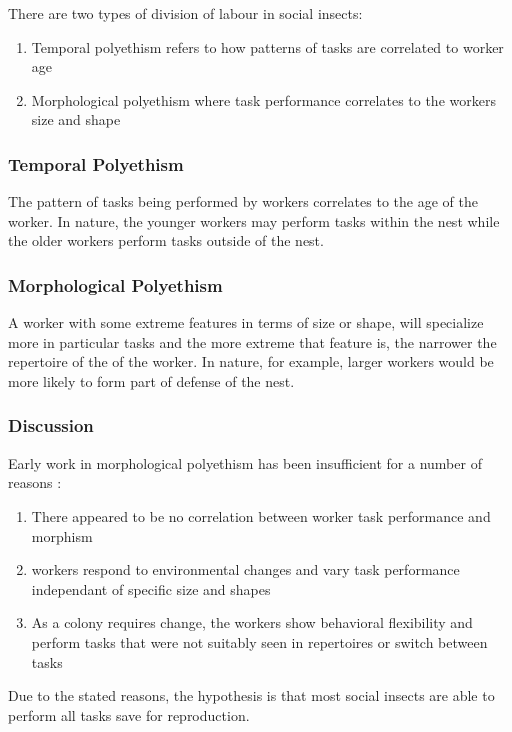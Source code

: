 There are two types of division of labour in social insects: 
\begin{enumerate}
	\item Temporal polyethism refers to how patterns of tasks are correlated to worker age
	\item Morphological polyethism where task performance correlates to the workers size and shape
\end{enumerate}

\subsubsection{Temporal Polyethism}
The pattern of tasks being performed by workers correlates to the age of the worker. In nature, the younger workers may perform tasks within the nest while the older workers perform tasks outside of the nest.
\subsubsection{Morphological Polyethism}
A worker with some extreme features in terms of size or shape, will specialize more in particular tasks and the more extreme that feature is, the narrower the repertoire of the of the worker. In nature, for example, larger workers would be more likely to form part of defense of the nest. \cite{beshers2001models}

\subsubsection{Discussion}
Early work in morphological polyethism has been insufficient for a number of reasons \cite{huang1996regulation}: 

\begin{enumerate}
	\item There appeared to be no correlation between worker task performance and morphism
	\item workers respond to environmental changes and vary task performance independant of specific size and shapes
	\item As a colony requires change, the workers show behavioral flexibility and perform tasks that were not suitably seen in repertoires or switch between tasks

\end{enumerate}

Due to the stated reasons, the hypothesis is that most social insects are able to perform all tasks save for reproduction.

